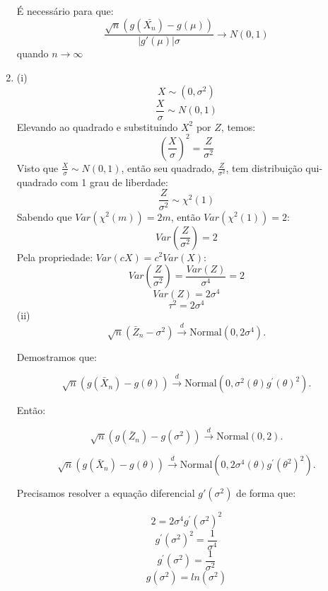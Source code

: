 \documentclass[a4paper,10pt, notitlepage]{report}
\begin{document}
\begin{enumerate}
		É necessário para que:
		$$\frac{\sqrt{n}(g(\bar{X_n}) - g(\mu))}{|g'(\mu)|\sigma} \rightarrow N(0,1)$$
		quando $n \rightarrow \infty$
		
		\item 
		(i)
		$$X \sim (0,\sigma^2)$$
		$$\frac{X}{\sigma}\sim N(0,1)$$
		Elevando ao quadrado e substituindo $X^2$ por $Z$, temos:
		$$\left(\frac{X}{\sigma}\right)^2 = \frac{Z}{\sigma^2}$$
		Visto que $\frac{X}{\sigma}\sim N(0,1)$, então seu quadrado, $\frac{Z}{\sigma^2}$, tem distribuição qui-quadrado com 1 grau de liberdade:
		$$\frac{Z}{\sigma^2} \sim \chi^2(1)$$
		Sabendo que $Var(\chi^2(m)) = 2m$, então $Var(\chi^2(1)) = 2$:
		$$Var\left(\frac{Z}{\sigma^2}\right) = 2$$
		Pela propriedade: $Var(cX) = c^2 Var(X)$:
		$$Var\left(\frac{Z}{\sigma^2}\right) = \frac{Var(Z)}{\sigma^4} = 2$$
		$$Var(Z) = 2\sigma^4$$
		$$\tau^2 = 2\sigma^4$$
		(ii)
		\begin{equation}
			\sqrt{n}\left(\bar{Z}_n - \sigma^2 \right) \xrightarrow{d} \textrm{Normal}\left(0, 2\sigma^4\right).
		\end{equation}

		Demostramos que:
		
		\begin{equation}
			\sqrt{n}\left(g(\bar{X}_n) - g(\theta) \right) \xrightarrow{d} \textrm{Normal}\left(0, \sigma^2(\theta)g^\prime(\theta)^2\right).
		\end{equation}
		
		Então:
		
		\begin{equation*}
			\sqrt{n}\left(g(\bar{Z}_n) - g(\sigma^2) \right) \xrightarrow{d} \textrm{Normal}\left(0, 2\right).
		\end{equation*}
	
		\begin{equation}
			\sqrt{n}\left(g(\bar{X}_n) - g(\theta) \right) \xrightarrow{d} \textrm{Normal}\left(0, 2\sigma^4(\theta)g^\prime(\theta^2)^2\right).
		\end{equation}
	
		Precisamos resolver a equação diferencial $g'(\sigma^2)$ de forma que:
		
		$$2 = 2\sigma^4 g^\prime(\sigma^2)^2$$
		$$g^\prime(\sigma^2)^2 = \frac{1}{\sigma^4}$$
		$$g^\prime(\sigma^2) = \frac{1}{\sigma^2}$$
		$$g(\sigma^2) = ln(\sigma^2)$$
	\end{enumerate}


	
	
\end{document}

